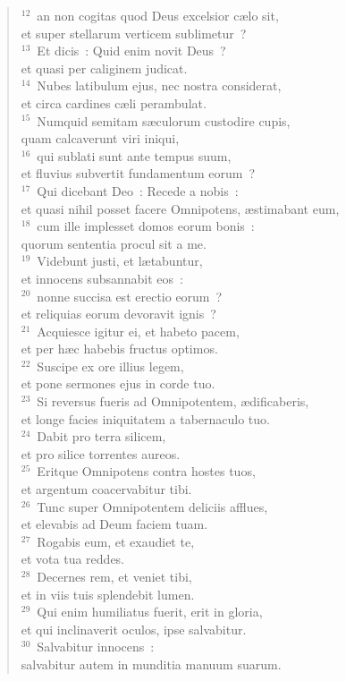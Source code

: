 \begin{flushleft}
\begin{verse}
${}^{12}$~an non cogitas quod Deus excelsior c\ae lo sit,\\ et super stellarum verticem sublimetur~?\\
${}^{13}$~Et dicis~: Quid enim novit Deus~?\\ et quasi per caliginem judicat.\\
${}^{14}$~Nubes latibulum ejus, nec nostra considerat,\\ et circa cardines c\ae li perambulat.\\
${}^{15}$~Numquid semitam s\ae culorum custodire cupis,\\ quam calcaverunt viri iniqui,\\
${}^{16}$~qui sublati sunt ante tempus suum,\\ et fluvius subvertit fundamentum eorum~?\\
${}^{17}$~Qui dicebant Deo~: Recede a nobis~:\\ et quasi nihil posset facere Omnipotens, \ae stimabant eum,\\
${}^{18}$~cum ille implesset domos eorum bonis~:\\ quorum sententia procul sit a me.\\
${}^{19}$~Videbunt justi, et l\ae tabuntur,\\ et innocens subsannabit eos~:\\
${}^{20}$~nonne succisa est erectio eorum~?\\ et reliquias eorum devoravit ignis~?\\
${}^{21}$~Acquiesce igitur ei, et habeto pacem,\\ et per h\ae c habebis fructus optimos.\\
${}^{22}$~Suscipe ex ore illius legem,\\ et pone sermones ejus in corde tuo.\\
${}^{23}$~Si reversus fueris ad Omnipotentem, \ae dificaberis,\\ et longe facies iniquitatem a tabernaculo tuo.\\
${}^{24}$~Dabit pro terra silicem,\\ et pro silice torrentes aureos.\\
${}^{25}$~Eritque Omnipotens contra hostes tuos,\\ et argentum coacervabitur tibi.\\
${}^{26}$~Tunc super Omnipotentem deliciis afflues,\\ et elevabis ad Deum faciem tuam.\\
${}^{27}$~Rogabis eum, et exaudiet te,\\ et vota tua reddes.\\
${}^{28}$~Decernes rem, et veniet tibi,\\ et in viis tuis splendebit lumen.\\
${}^{29}$~Qui enim humiliatus fuerit, erit in gloria,\\ et qui inclinaverit oculos, ipse salvabitur.\\
${}^{30}$~Salvabitur innocens~:\\ salvabitur autem in munditia manuum suarum.\end{verse}\end{flushleft}


